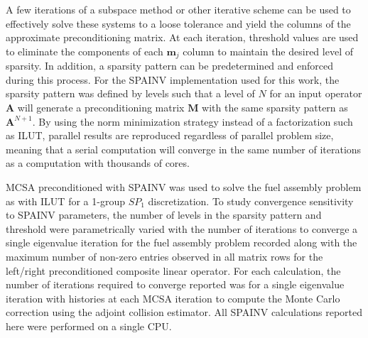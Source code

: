 A few iterations of a subspace method or other iterative scheme can be
used to effectively solve these systems to a loose tolerance and yield
the columns of the approximate preconditioning matrix. At each
iteration, threshold values are used to eliminate the components of
each $\mathbf{m}_j$ column to maintain the desired level of
sparsity. In addition, a sparsity pattern can be predetermined and
enforced during this process. For the SPAINV implementation used for
this work, the sparsity pattern was defined by levels such that a
level of $N$ for an input operator $\mathbf{A}$ will generate a
preconditioning matrix $\mathbf{M}$ with the same sparsity pattern as
$\mathbf{A}^{N+1}$. By using the norm minimization strategy instead of
a factorization such as ILUT, parallel results are reproduced
regardless of parallel problem size, meaning that a serial computation
will converge in the same number of iterations as a computation with
thousands of cores.

MCSA preconditioned with SPAINV was used to solve the fuel assembly
problem as with ILUT for a 1-group $SP_1$ discretization. To study
convergence sensitivity to SPAINV parameters, the number of levels in
the sparsity pattern and threshold were parametrically varied with the
number of iterations to converge a single eigenvalue iteration for the
fuel assembly problem recorded along with the maximum number of
non-zero entries observed in all matrix rows for the left/right
preconditioned composite linear operator. For each calculation, the
number of iterations required to converge reported was for a single
eigenvalue iteration with  histories at each MCSA iteration
to compute the Monte Carlo correction using the adjoint collision
estimator. All SPAINV calculations reported here were performed on a
single CPU.

